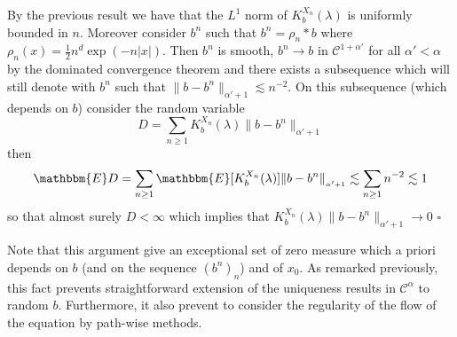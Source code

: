 \documentclass[a4paper,11pt]{article}
\newenvironment{proof}{{\sc Proof.}}{\hfill$\square$}
\newcommand{\CC}{\mathscr C}
\begin{document}
\begin{proof}
  By the previous result we have that the $L^{1}$ norm of $K_{b}^{X_{n}} (
  \lambda )$ is uniformly bounded in $n$. Moreover consider $b^{n}$ such that
  $b^{n} = \rho_{n} \ast b$ where $\rho_{n} (x) = \frac{1}{2} n^{d} \exp  (-n
  |x| )$. Then $b^{n}$ is smooth, $b^{n} \to b$ in $\CC^{1+ \alpha'}$ for all
  $\alpha' < \alpha$ by the dominated convergence theorem and there exists a
  subsequence which will still denote with $b^{n}$ such that $\| b-b^{n}
  \|_{\alpha' +1} \lesssim n^{-2}$. On this subsequence (which depends on $b$)
  consider the random variable
  \[ D= \sum_{n \ge 1} K_{b}^{X_{n}} ( \lambda ) \|b-b^{n} \|_{\alpha' +1} \]
  then
  \[ \mathbbm{E}D= \sum_{n \ge 1} \mathbbm{E} [ K_{b}^{X_{n}} ( \lambda ) ] 
     \|b-b^{n} \|_{_{\alpha' +1}} \lesssim \sum_{n \ge 1} n^{-2} \lesssim 1 \]
  so that almost surely $D< \infty$ which implies that $K_{b}^{X_{n}} (
  \lambda )  \|b-b^{n} \|_{\alpha' +1} \to 0$
\end{proof}

Note that this argument give an exceptional set of zero measure which a priori
depends on $b$ (and on the sequence $(b^{n} )_{n}$) and of $x_{0}$. As
remarked previously, this fact prevents straightforward extension of the
uniqueness results in $\CC^{\alpha}$ to random $b$. Furthermore, it also
prevent to consider the regularity of the flow of the equation by path-wise
methods.
\end{document}
